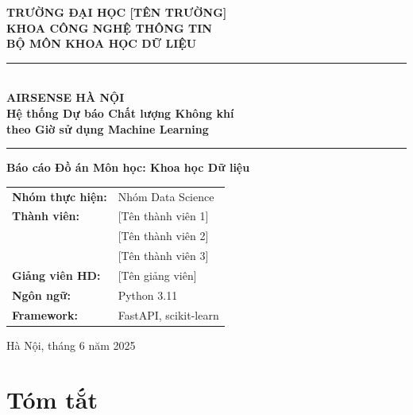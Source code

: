 \documentclass[12pt,a4paper]{report}
\begin{document}
\begin{titlepage}
\centering
\vspace*{1cm}

{\large\textbf{TRƯỜNG ĐẠI HỌC [TÊN TRƯỜNG]}}\\[0.3cm]
{\large\textbf{KHOA CÔNG NGHỆ THÔNG TIN}}\\[0.3cm]
{\large\textbf{BỘ MÔN KHOA HỌC DỮ LIỆU}}

\vspace{1.5cm}


\vspace{0.8cm}

\rule{\linewidth}{2pt}\\[0.3cm]
{\Huge\bfseries\color{headerblue} AIRSENSE HÀ NỘI}\\[0.4cm]
{\LARGE\bfseries Hệ thống Dự báo Chất lượng Không khí\\theo Giờ sử dụng Machine Learning}\\[0.2cm]
\rule{\linewidth}{2pt}

\vspace{1cm}

\begin{minipage}{0.72\textwidth}
\centering
{\large \textbf{Báo cáo Đồ án Môn học: Khoa học Dữ liệu}}\\[0.6cm]
\begin{tabular}{ll}
\textbf{Nhóm thực hiện:} & Nhóm Data Science \\[3pt]
\textbf{Thành viên:}     & [Tên thành viên 1] \\
                          & [Tên thành viên 2] \\
                          & [Tên thành viên 3] \\[3pt]
\textbf{Giảng viên HD:}  & [Tên giảng viên] \\[3pt]
\textbf{Ngôn ngữ:}       & Python 3.11 \\
\textbf{Framework:}       & FastAPI, scikit-learn \\
\end{tabular}
\end{minipage}

\vfill
{\large Hà Nội, tháng 6 năm 2025}
\end{titlepage}

\chapter*{Tóm tắt}
\thispagestyle{fancy}
\end{document}

